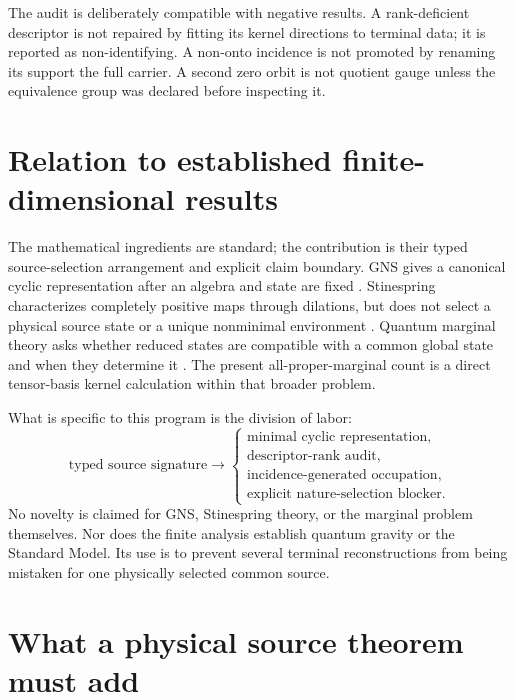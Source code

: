 \documentclass[11pt]{article}
\begin{document}
The audit is deliberately compatible with negative results.  A rank-deficient
descriptor is not repaired by fitting its kernel directions to terminal data;
it is reported as non-identifying.  A non-onto incidence is not promoted by
renaming its support the full carrier.  A second zero orbit is not quotient
gauge unless the equivalence group was declared before inspecting it.

\section{Relation to established finite-dimensional results}

The mathematical ingredients are standard; the contribution is their typed
source-selection arrangement and explicit claim boundary.  GNS gives a
canonical cyclic representation after an algebra and state are fixed
\cite{Segal1947}.  Stinespring characterizes completely positive maps through
dilations, but does not select a physical source state or a unique
nonminimal environment \cite{Stinespring1955}.  Quantum marginal theory asks
whether reduced states are compatible with a common global state and when
they determine it \cite{Klyachko2006,Bravyi2004,
LindenPopescuWootters2002}.  The present all-proper-marginal count is a direct
tensor-basis kernel calculation within that broader problem.

What is specific to this program is the division of labor:
\begin{equation}
 \text{typed source signature}
 \longrightarrow
 \begin{cases}
  \text{minimal cyclic representation},\\
  \text{descriptor-rank audit},\\
  \text{incidence-generated occupation},\\
  \text{explicit nature-selection blocker}.
 \end{cases}
 \label{eq:division-of-labor}
\end{equation}
No novelty is claimed for GNS, Stinespring theory, or the marginal problem
themselves.  Nor does the finite analysis establish quantum gravity or the
Standard Model.  Its use is to prevent several terminal reconstructions from
being mistaken for one physically selected common source.

\section{What a physical source theorem must add}
\end{document}
